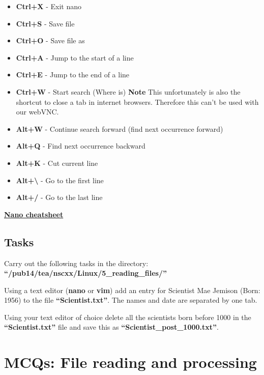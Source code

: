 \documentclass[
  letterpaper,
  DIV=11,
  numbers=noendperiod]{scrreprt}
\providecommand{\tightlist}{%
  \setlength{\itemsep}{0pt}\setlength{\parskip}{0pt}}\usepackage{longtable,booktabs,array}
\begin{document}
\begin{itemize}
\tightlist
\item
  \textbf{Ctrl+X} - Exit nano
\item
  \textbf{Ctrl+S} - Save file
\item
  \textbf{Ctrl+O} - Save file as
\item
  \textbf{Ctrl+A} - Jump to the start of a line
\item
  \textbf{Ctrl+E} - Jump to the end of a line
\item
  \textbf{Ctrl+W} - Start search (Where is) \textbf{Note} This
  unfortunately is also the shortcut to close a tab in internet
  browsers. Therefore this can't be used with our webVNC.
\item
  \textbf{Alt+W} - Continue search forward (find next occurrence
  forward)
\item
  \textbf{Alt+Q} - Find next occurrence backward
\item
  \textbf{Alt+K} - Cut current line
\item
  \textbf{Alt+\textbackslash{}} - Go to the first line
\item
  \textbf{Alt+/} - Go to the last line
\end{itemize}

\href{https://www.nano-editor.org/dist/latest/cheatsheet.html}{\textbf{Nano
cheatsheet}}

\hypertarget{tasks}{%
\subsection{Tasks}\label{tasks}}

Carry out the following tasks in the directory:
\textbf{``/pub14/tea/nscxx/Linux/5\_reading\_files/''}

Using a text editor (\textbf{nano} or \textbf{vim}) add an entry for
Scientist Mae Jemison (Born: 1956) to the file
\textbf{``Scientist.txt''}. The names and date are separated by one tab.

Using your text editor of choice delete all the scientists born before
1000 in the \textbf{``Scientist.txt''} file and save this as
\textbf{``Scientist\_post\_1000.txt''}.

\hypertarget{mcqs-file-reading-and-processing}{%
\section{MCQs: File reading and
processing}\label{mcqs-file-reading-and-processing}}
\end{document}
